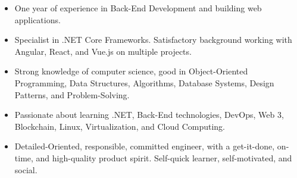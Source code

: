 





\begin{itemize}
    \item One year of experience in Back-End Development and building web applications.
    \item Specialist in .NET Core Frameworks. Satisfactory background working with Angular, React, and Vue.js on multiple projects.
    \item Strong knowledge of computer science, good in Object-Oriented Programming, Data Structures, Algorithms, Database Systems, Design Patterns, and Problem-Solving.
    \item Passionate about learning .NET, Back-End technologies, DevOps, Web 3, Blockchain, Linux, Virtualization, and Cloud Computing.
    \item Detailed-Oriented, responsible, committed engineer, with a get-it-done, on-time, and high-quality product spirit. Self-quick learner, self-motivated, and social.
\end{itemize}